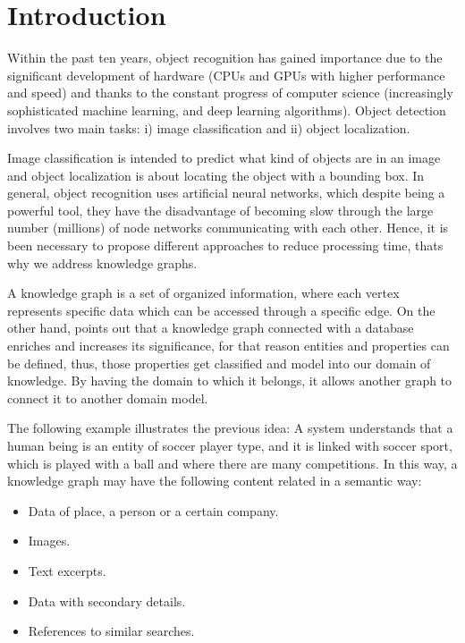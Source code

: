 \section{Introduction}
Within the past ten years, object recognition
has gained importance due to the significant development of 
hardware (CPUs and GPUs with higher performance and speed) and thanks to the 
constant progress of computer science (increasingly sophisticated machine 
learning, and deep learning algorithms). Object detection involves two main 
tasks: i) image classification and ii) object localization.

Image classification is intended to predict what kind of objects are in 
an image and object localization is about locating the object 
with a bounding box. In general, object recognition uses artificial 
neural networks, which despite being a powerful tool, they have the disadvantage 
of becoming slow through the large number (millions) of node networks 
communicating with each other. Hence, it is been necessary to propose different 
approaches to reduce processing time, thats why we address knowledge graphs.

A knowledge graph is a set of organized information, where each vertex 
represents specific data which can be accessed through a specific edge. 
On the other hand, \cite{Saorin} points out that a knowledge graph connected 
with a database enriches and increases its
significance, for that reason entities and properties can be defined, thus, 
those properties get classified and model  into our domain of knowledge. 
By having the domain to which it belongs, it allows another graph to connect it 
to another domain model.

The following example illustrates the previous idea: A system understands that 
a human being is an entity of soccer player type, and it is linked with soccer 
sport, which is played with a ball and where there are many competitions. 
In this way, a knowledge graph may have the following content related in a 
semantic way:

\begin{itemize}
\item Data of place, a person or a certain company.
\item Images.
\item Text excerpts.
\item Data with secondary details.
\item References to similar searches.
\end{itemize}

